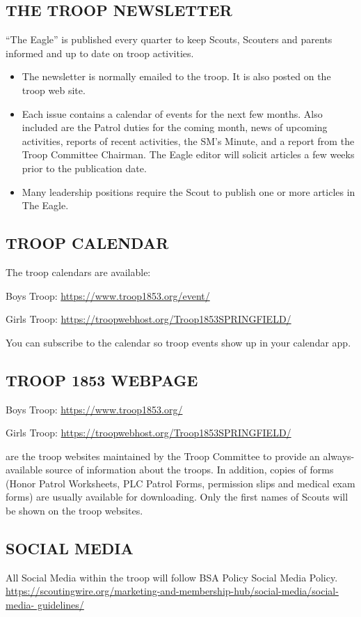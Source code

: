 \documentclass{ltxguide}
\begin{document}
\subsection{THE TROOP NEWSLETTER}
“The Eagle” is published every quarter to keep Scouts, Scouters and parents informed and up to date on troop activities.

\begin{itemize}
	\item The newsletter is normally emailed to the troop. It is also posted on the troop web site.
	\item Each issue contains a calendar of events for the next few months. Also included are the Patrol duties for the coming month, news of upcoming activities, reports of recent activities, the \ac{SM}'s Minute, and a report from the Troop Committee Chairman. The Eagle editor will solicit articles a few weeks prior to the publication date. 
	\item Many leadership positions require the Scout to publish one or more articles in The Eagle.
\end{itemize}

\subsection{TROOP CALENDAR}
The troop calendars are available:

Boys Troop: \url{https://www.troop1853.org/event/}

Girls Troop: \url{https://troopwebhost.org/Troop1853SPRINGFIELD/}

You can subscribe to the calendar so troop events show up in your calendar app. 

\subsection{TROOP 1853 WEBPAGE}
Boys Troop: \url{https://www.troop1853.org/}

Girls Troop: \url{https://troopwebhost.org/Troop1853SPRINGFIELD/}

are the troop websites maintained by the Troop Committee to provide an always- available source of information about the troops. In addition, copies of forms (Honor Patrol Worksheets, \ac{PLC} Patrol Forms, permission slips and medical exam forms) are usually available for downloading. Only the first names of Scouts will be shown on the troop  websites.

\subsection{SOCIAL MEDIA}
All Social Media within the troop will follow \ac{BSA} Policy Social Media Policy. 
\url{https://scoutingwire.org/marketing-and-membership-hub/social-media/social-media- guidelines/}
\end{document}
